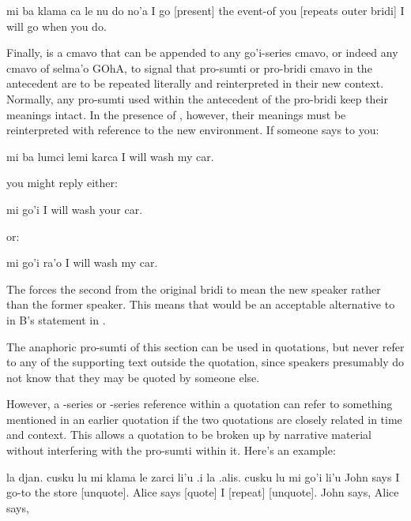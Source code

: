 \begin{example}
mi ba klama ca le nu\n
\T	do no'a\n
I  go [present] the event-of\n
\T	you [repeats outer bridi]\n
I will go when you do.
\end{example}

Finally,  is a cmavo that can be appended to any
    go'i-series cmavo, or indeed any cmavo of selma'o GOhA, to
    signal that pro-sumti or pro-bridi cmavo in the antecedent are
    to be repeated literally and reinterpreted in their new
    context. Normally, any pro-sumti used within the antecedent of
    the pro-bridi keep their meanings intact. In the presence of
    , however, their meanings must be reinterpreted with
    reference to the new environment. If someone says to you:
\begin{example}
mi ba lumci lemi karca\n
I will wash my car.
\end{example}

{\noindent}you might reply either:
\begin{example}
mi go'i\n
I will wash your car.
\end{example}

{\noindent}or:
\begin{example}
mi go'i ra'o\n
I will wash my car.
\end{example}

The  forces the second  from the original
    bridi to mean the new speaker rather than the former speaker.
    This means that  would be an acceptable
    alternative to  in B's statement in .

The anaphoric pro-sumti of this section can be used in
    quotations, but never refer to any of the supporting text
    outside the quotation, since speakers presumably do not know
    that they may be quoted by someone else.

However, a -series or -series reference within
    a quotation can refer to something mentioned in an earlier
    quotation if the two quotations are closely related in time and
    context. This allows a quotation to be broken up by narrative
    material without interfering with the pro-sumti within it.
    Here's an example:
\begin{example}
la djan. cusku lu mi klama le zarci li'u\n
\T	.i la .alis. cusku lu mi go'i li'u\n
John says  I go-to the store [unquote].\n
\T	Alice says [quote] I [repeat] [unquote].\n
John says, \n
\T	Alice says, 
\end{example}


